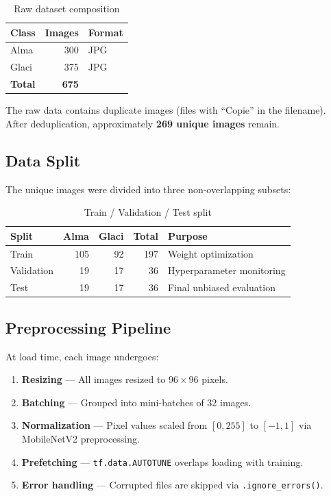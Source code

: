 \documentclass[12pt,a4paper]{article}
\begin{document}
\begin{table}[H]
    \centering
    \caption{Raw dataset composition}
    \begin{tabular}{@{}lrl@{}}
        \toprule
        \textbf{Class} & \textbf{Images} & \textbf{Format} \\
        \midrule
        Alma    & 300 & JPG \\
        Glaci   & 375 & JPG \\
        \midrule
        \textbf{Total} & \textbf{675} & \\
        \bottomrule
    \end{tabular}
\end{table}

The raw data contains duplicate images (files with ``Copie'' in the filename). After deduplication, approximately \textbf{269 unique images} remain.

\subsection{Data Split}

The unique images were divided into three non-overlapping subsets:

\begin{table}[H]
    \centering
    \caption{Train / Validation / Test split}
    \begin{tabular}{@{}lrrrl@{}}
        \toprule
        \textbf{Split} & \textbf{Alma} & \textbf{Glaci} & \textbf{Total} & \textbf{Purpose} \\
        \midrule
        Train      & 105 & 92 & 197 & Weight optimization \\
        Validation & 19  & 17 & 36  & Hyperparameter monitoring \\
        Test       & 19  & 17 & 36  & Final unbiased evaluation \\
        \bottomrule
    \end{tabular}
\end{table}

\subsection{Preprocessing Pipeline}

At load time, each image undergoes:

\begin{enumerate}
    \item \textbf{Resizing} --- All images resized to $96 \times 96$ pixels.
    \item \textbf{Batching} --- Grouped into mini-batches of 32 images.
    \item \textbf{Normalization} --- Pixel values scaled from $[0, 255]$ to $[-1, 1]$ via MobileNetV2 preprocessing.
    \item \textbf{Prefetching} --- \texttt{tf.data.AUTOTUNE} overlaps loading with training.
    \item \textbf{Error handling} --- Corrupted files are skipped via \texttt{.ignore\_errors()}.
\end{enumerate}
\end{document}
